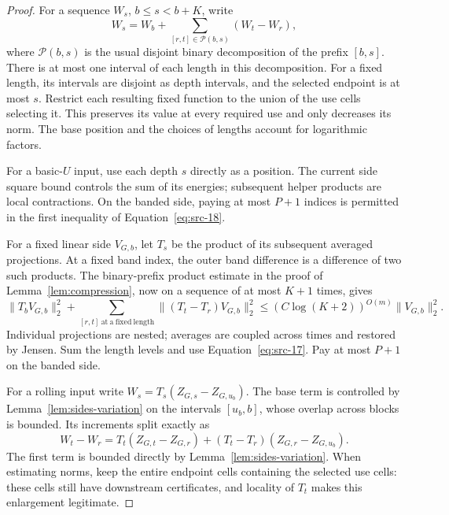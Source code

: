 \begin{proof}
For a sequence $W_s$, $b\le s<b+K$, write
\[
 W_s=W_b+\sum_{[r,t]\in\mathcal P(b,s)}(W_t-W_r),
\]
where $\mathcal P(b,s)$ is the usual disjoint binary decomposition
of the prefix $[b,s]$.  There is at most one interval of each length
in this decomposition.  For a fixed length, its intervals are
disjoint as depth intervals, and the selected endpoint is at most
$s$.  Restrict each resulting fixed function to the union of the
use cells selecting it.  This preserves its value at every required
use and only decreases its norm.  The base position and the choices
of lengths account for logarithmic factors.

For a basic-$U$ input, use each depth $s$ directly as a position.
The current side square bound controls the sum of its energies;
subsequent helper products are local contractions.  On the banded
side, paying at most $P+1$ indices is permitted in the first
inequality of Equation~\eqref{eq:src-18}.

For a fixed linear side $V_{G,b}$, let $T_s$ be the product of its
subsequent averaged projections.  At a fixed band index, the outer
band difference is a difference of two such products.  The
binary-prefix product estimate in the proof of
Lemma~\ref{lem:compression}, now on a sequence of at most $K+1$
times, gives
\[
 \|T_bV_{G,b}\|_2^2+
 \sum_{[r,t]\ \mathrm{at\ a\ fixed\ length}}
       \|(T_t-T_r)V_{G,b}\|_2^2
 \le (C\log(K+2))^{O(m)}\|V_{G,b}\|_2^2.
\]
Individual projections are nested; averages are coupled across
times and restored by Jensen.  Sum the length levels and use
Equation~\eqref{eq:src-17}.  Pay at most $P+1$ on the banded side.

For a rolling input write $W_s=T_s(Z_{G,s}-Z_{G,u_b})$.  The base
term is controlled by
Lemma~\ref{lem:sides-variation} on the intervals $[u_b,b]$, whose
overlap across blocks is bounded.  Its increments split exactly as
\[
 W_t-W_r
 =T_t(Z_{G,t}-Z_{G,r})
       +(T_t-T_r)(Z_{G,r}-Z_{G,u_b}).
\]
The first term is bounded directly by
Lemma~\ref{lem:sides-variation}.  When estimating norms, keep the
entire endpoint cells containing the selected use cells: these
cells still have downstream certificates, and locality of $T_t$
makes this enlargement legitimate.


\end{proof}

